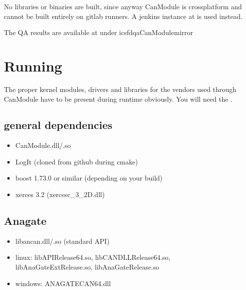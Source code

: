 \documentclass[a4paper,10pt,english]{sphinxmanual}
\begin{document}
No libraries or binaries are built, since anyway CanModule is cross\sphinxhyphen{}platform and cannot be built entirely on gitlab
runners. A jenkins instance at  is used instead.

The QA results are available at  under ics\sphinxhyphen{}fd\sphinxhyphen{}qa\sphinxhyphen{}CanModule\sphinxhyphen{}mirror


\chapter{Running}
\label{\detokenize{running:running}}\label{\detokenize{running::doc}}
The proper kernel modules, drivers and libraries for the vendors used through CanModule
have to be present during runtime obviously. You will need the  .


\section{general dependencies}
\label{\detokenize{running:general-dependencies}}\begin{itemize}
\item {} 
CanModule.dll/.so

\item {} 
LogIt (cloned from github during cmake)

\item {} 
boost 1.73.0 or similar (depending on your build)

\item {} 
xerces 3.2 (xerces\sphinxhyphen{}c\_3\_2D.dll)

\end{itemize}


\section{Anagate}
\label{\detokenize{running:anagate}}\begin{itemize}
\item {} 
libancan.dll/.so  (standard API)

\item {} 
linux: libAPIRelease64.so, libCANDLLRelease64.so, libAnaGateExtRelease.so, libAnaGateRelease.so

\item {} 
windows: ANAGATECAN64.dll

\end{itemize}
\end{document}
